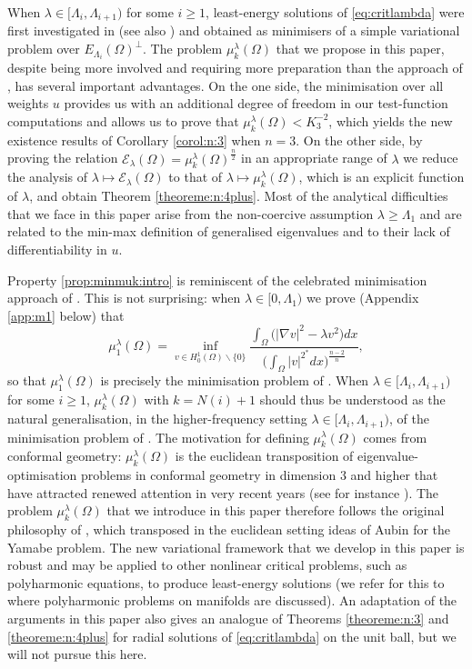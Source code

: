 \documentclass[10pt]{amsart}
\numberwithin{equation}{section}
\newcommand{\Om}{\Omega}
\newcommand{\mkl}{\mu_{k}^{\lambda}}
\theoremstyle{plain}
\theoremstyle{remark}
\begin{document}
When $\lambda \in [\Lambda_i, \Lambda_{i+1})$ for some $i \ge 1$, least-energy solutions of \eqref{eq:critlambda} were first investigated in \cite{SzulkinWethWillem} (see also \cite{ChenShiojiZou}) and obtained as minimisers of a simple variational problem over $E_{\Lambda_i}(\Om)^{\perp}$. The problem $\mkl(\Om)$ that we propose in this paper, despite being more involved and requiring more preparation than the approach of \cite{SzulkinWethWillem}, has several important advantages. On the one side, the minimisation over all weights $u$ provides us with an additional degree of freedom  in our test-function computations and allows us to prove that $\mkl(\Om) < K_3^{-2}$, which yields the new existence results of Corollary \ref{corol:n:3} when $n=3$. On the other side, by proving the relation $\mathcal{E}_\lambda(\Om) = \mkl(\Om)^{\frac{n}{2}}$ in an appropriate range of $\lambda$ we reduce the analysis of $\lambda \mapsto \mathcal{E}_\lambda(\Om)$ to that of $\lambda \mapsto \mkl(\Om)$, which is an explicit function of $\lambda$, and obtain Theorem \ref{theoreme:n:4plus}. Most of the analytical difficulties that we face in this paper arise from the non-coercive assumption $\lambda \ge \Lambda_1$ and are related to the min-max definition of generalised eigenvalues and to their lack of differentiability in $u$. 

\medskip

Property \eqref{prop:minmuk:intro} is reminiscent of the celebrated minimisation approach of \cite{BN}. This is not surprising:  when $\lambda \in [0, \Lambda_1)$ we prove (Appendix \ref{app:m1} below) that
$$ \mu_1^{\lambda}(\Om) = \inf_{v \in H^1_0(\Om)\backslash \{0\}} \frac{\int_{\Om} \big( |\nabla v|^2 - \lambda v^2 \big)dx}{\big(\int_{\Om}|v|^{2^*}dx \big)^{\frac{n-2}{n}}},$$
so that $\mu_1^{\lambda}(\Om)$ is precisely the minimisation problem of \cite{BN}. When $\lambda \in [\Lambda_i, \Lambda_{i+1})$ for some $i \ge 1$, $\mkl(\Om)$ with $k = N(i)+1$ should thus be understood as the natural generalisation, in the higher-frequency setting $\lambda \in [\Lambda_i, \Lambda_{i+1})$, of the minimisation problem of \cite{BN}. The motivation for defining $\mkl(\Om)$ comes from conformal geometry: $\mkl(\Om)$ is the euclidean transposition of eigenvalue-optimisation problems in conformal geometry in dimension $3$ and higher that have attracted renewed attention in very recent years (see for instance \cite{AmmannHumbert, AmmannJammes, GurskyPerez, HumbertPetridesPremoselli, PetridesTewodrose, PremoselliVetois4}). The problem $\mkl(\Om)$ that we introduce in this paper therefore follows the original philosophy of \cite{BN}, which transposed in the euclidean setting ideas of Aubin \cite{AubinYamabe} for the Yamabe problem. The new variational framework that we develop in this paper is robust and may be applied to other nonlinear critical problems, such as polyharmonic equations, to produce least-energy solutions (we refer for this to \cite{HumbertPetridesPremoselli} where polyharmonic problems on manifolds are discussed). An adaptation of the arguments in this paper also gives an analogue of Theorems \ref{theoreme:n:3} and \ref{theoreme:n:4plus} for radial solutions of \eqref{eq:critlambda} on the unit ball, but we will not pursue this here. 
\end{document}

